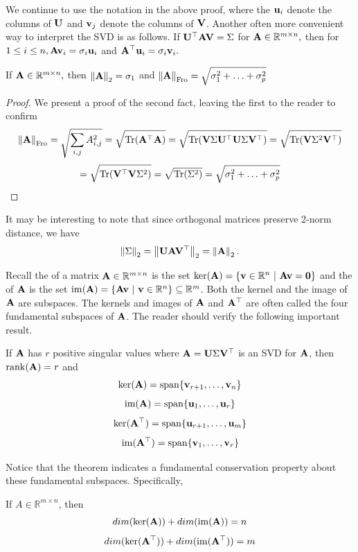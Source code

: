 We continue to use the notation in the above proof, where the $\vu_i$ denote the columns of $\MU$ and $\vv_j$ denote the columns of $\MV$. Another often more convenient way to interpret the SVD is as follows.
If $\MU^\top \MA \MV = \Sigma$ for $\MA \in \mathbb R^{m \times n},$ then for $1 \leq i \leq n, \MA\vv_i = \sigma_i \vu_i$ and $\MA^\top \vu_i = \sigma_i \vv_i.$


\begin{proposition}
If $\MA \in \mathbb R^{m \times n},$ then $\norm{\MA}_2 = \sigma_1$ and $\norm{\MA}_{\Fro} = \sqrt{\sigma_1^2 + \ldots + \sigma_p^2}$
\end{proposition}

\begin{proof}
We present a proof of the second fact, leaving the first to the reader to confirm
$$\norm{\MA}_{\Fro} = \sqrt{\sum_{i,j} A_{i,j}^2} = \sqrt{\trace(\MA^\top\MA)} = \sqrt{\trace(\MV \Sigma \MU^\top \MU \Sigma \MV^\top)} = \sqrt{\trace(\MV \Sigma^2 \MV^\top)} $$
$$ = \sqrt{\trace(\MV^\top\MV \Sigma^2)} = \sqrt{\trace(\Sigma^2)} = \sqrt{\sigma_1^2 + \ldots + \sigma_p^2}$$
\end{proof}

It may be interesting to note that since orthogonal matrices preserve 2-norm distance, we have
$$\norm{\Sigma}_2 = \norm{\MU\MA\MV^\top}_2 = \norm{\MA}_2.$$

Recall the  of a matrix $\MA\in\R^{m\times n}$ is the set $\kernel(\MA) = \{\vv\in\R^n \ | \ \MA\vv = \vzero\}$ and the  of $\MA$ is the set $\image(\MA) = \{\MA\vv \ | \ \vv\in\R^n\}\subseteq \R^m$. Both the kernel and the image of $\MA$ are subspaces. The kernels and images of $\MA$ and $\MA^\top$ are often called the four fundamental subspaces of $\MA$. The reader should verify the following important result.
\begin{theorem}
If $\MA$ has $r$ positive singular values where $\MA = \MU\Sigma\MV^\top$ is an SVD for $\MA$, then $\rank(\MA) = r$ and 
$$\kernel(\MA) = \spann \{ \vv_{r+1}, \ldots, \vv_n \}$$
$$\image(\MA) = \spann \{ \vu_1, \ldots, \vu_r \}$$
$$\kernel(\MA^\top) = \spann \{ \vu_{r+1}, \ldots, \vu_m \}$$
$$\image(\MA^\top) = \spann \{ \vv_1, \ldots, \vv_r \}$$
\end{theorem}

Notice that the theorem indicates a fundamental conservation property about these fundamental subspaces. Specifically, 

\begin{corollary}
If $A \in \mathbb R^{m \times n}$, then 
$$dim(\kernel(\MA)) + dim(\image(\MA)) = n$$
$$dim(\kernel(\MA^\top)) + dim(\image(\MA^\top)) = m$$
\end{corollary}

